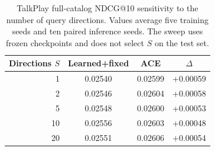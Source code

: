 \begin{table}[t]
\centering\small
\begin{tabular}{rccc}
\toprule
Directions $S$ & Learned+fixed & ACE & $\Delta$\\
\midrule
1 & 0.02540 & 0.02599 & +0.00059\\
2 & 0.02546 & 0.02604 & +0.00058\\
5 & 0.02548 & 0.02600 & +0.00053\\
10 & 0.02556 & 0.02603 & +0.00048\\
20 & 0.02551 & 0.02606 & +0.00054\\
\bottomrule
\end{tabular}
\caption{TalkPlay full-catalog NDCG@10 sensitivity to the number of query directions. Values average five training seeds and ten paired inference seeds. The sweep uses frozen checkpoints and does not select $S$ on the test set.}
\label{tab:direction-sensitivity}
\end{table}
